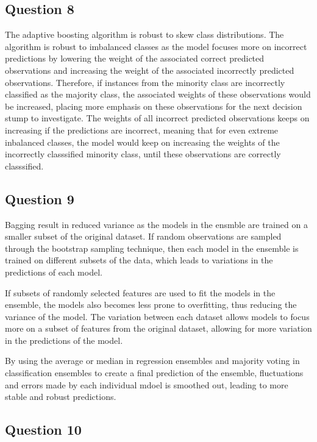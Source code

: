 \documentclass[10pt]{article}
\begin{document}
\subsection*{Question 8}

The adaptive boosting algorithm is robust to skew class distributions. The algorithm is robust to imbalanced classes
as the model focuses more on incorrect predictions by lowering the weight of the associated correct predicted observations
and increasing the weight of the associated incorrectly predicted observations. Therefore, if instances from the minority
class are incorrectly classified as the majority class, the associated weights of these observations would be increased, placing
more emphasis on these observations for the next decision stump to investigate. The weights of all incorrect predicted
observations keeps on increasing if the predictions are incorrect, meaning that for even extreme inbalanced classes, the
model would keep on increasing the weights of the incorrectly classsified minority class, until these observations
are correctly classsified.

\subsection*{Question 9}

Bagging result in reduced variance as the models in the ensmble are trained on a smaller
subset of the original dataset. If random observations are sampled through the bootstrap
sampling technique, then each model in the ensemble is trained on different subsets of the data,
which leads to variations in the predictions of each model.

If subsets of randomly selected features are used to fit the models in the ensemble, the models also becomes less prone
to overfitting, thus reducing the variance of the model. The variation between each dataset allows models to focus more
on a subset of features from the original dataset, allowing for more variation in the predictions of the model.

By using the average or median in regression ensembles and majority voting in classification ensembles to create
a final prediction of the ensemble, fluctuations and errors made by each individual mdoel is smoothed out,
leading to more stable and robust predictions.

\subsection*{Question 10}
\end{document}
